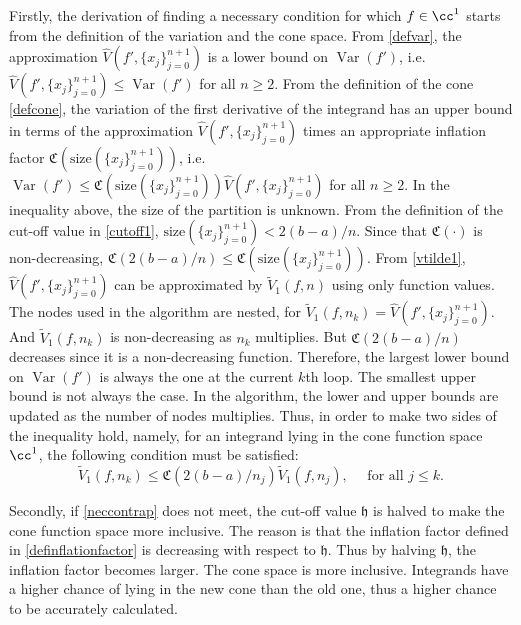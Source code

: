 \documentclass{iitthesis}
\DeclareMathOperator{\Var}{Var}
\theoremstyle{definition}
\theoremstyle{remark}
\begin{document}
Firstly, the derivation of finding a necessary condition for which $f\in\cc^1$ starts from the definition of the variation and the cone space. From \eqref{defvar}, the approximation $\widehat{V}({f'},\{x_j\}_{j=0}^{n+1})$ is a lower bound on $\Var({f'})$, i.e. $\widehat{V}({f'},\{x_j\}_{j=0}^{n+1})\leq \Var({f'})$ for all $n \ge 2$. From the definition of the cone \eqref{defcone}, the variation of the first derivative of the integrand has an upper bound in terms of the approximation $\widehat{V}({f'},\{x_j\}_{j=0}^{n+1})$ times an appropriate inflation factor $\mathfrak{C}(\text{size}(\{x_j\}_{j=0}^{n+1}))$, i.e. $\Var({f'})\leq \mathfrak{C}(\text{size}(\{x_j\}_{j=0}^{n+1}))\widehat{V}({f'},\{x_j\}_{j=0}^{n+1})$ for all $n \ge 2$.
In the inequality above, the size of the partition is unknown. From the definition of the cut-off value in \eqref{cutoff1}, $\text{size}(\{x_j\}_{j=0}^{n+1})<2(b-a)/n$. Since that $\mathfrak{C}(\cdot)$ is non-decreasing, $\mathfrak{C}(2(b-a)/n)\leq \mathfrak{C}(\text{size}(\{x_j\}_{j=0}^{n+1}))$. From \eqref{vtilde1}, $\widehat{V}({f'},\{x_j\}_{j=0}^{n+1})$ can be approximated by $\widetilde{V}_1(f,n)$ using only function values. The nodes used in the algorithm are nested, for $\widetilde{V}_1(f,n_k)=\widehat{V}({f'},\{x_j\}_{j=0}^{n+1})$. And $\widetilde{V}_1(f,n_k)$ is non-decreasing as $n_k$ multiplies. But $\mathfrak{C}(2(b-a)/n)$ decreases since it is a non-decreasing function. Therefore, the largest lower bound on $\Var(f')$ is always the one at the current $k$th loop. The smallest upper bound is not always the case. In the algorithm, the lower and upper bounds are updated as the number of nodes multiplies.
Thus, in order to make two sides of the inequality hold, namely, for an integrand lying in the cone function space $\cc^1$, the following condition must be satisfied:
\begin{equation}\label{neccontrap}
    \widetilde{V}_1(f,n_k)\leq\mathfrak{C}(2(b-a)/n_{j})\widetilde{V}_1(f,n_j), \quad \text{ for all } j \leq k.
\end{equation}

Secondly, if \eqref{neccontrap} does not meet, the cut-off value $\mathfrak{h}$ is halved to make the cone function space more inclusive. The reason is that the inflation factor defined in \eqref{definflationfactor} is decreasing with respect to $\mathfrak{h}$. Thus by halving $\mathfrak{h}$, the inflation factor becomes larger. The cone space is more inclusive. Integrands have a higher chance of lying in the new cone than the old one, thus a higher chance to be accurately calculated.
\end{document}

